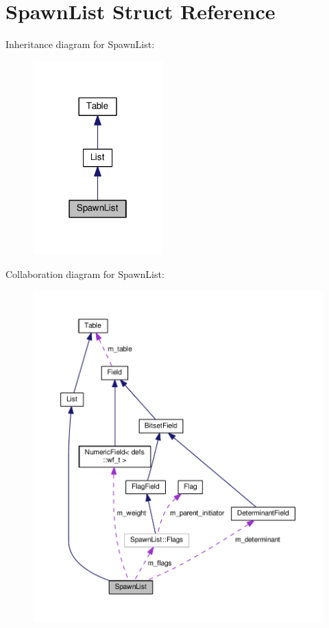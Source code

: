 \hypertarget{structSpawnList}{}\section{Spawn\+List Struct Reference}
\label{structSpawnList}


Inheritance diagram for Spawn\+List\+:
\nopagebreak
\begin{figure}[H]
\begin{center}
\leavevmode
\includegraphics[width=142pt]{structSpawnList__inherit__graph}
\end{center}
\end{figure}


Collaboration diagram for Spawn\+List\+:
\nopagebreak
\begin{figure}[H]
\begin{center}
\leavevmode
\includegraphics[width=350pt]{structSpawnList__coll__graph}
\end{center}
\end{figure}
